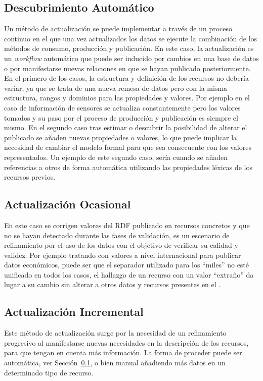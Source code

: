\subsection{Descubrimiento Automático}\label{sect:desc-auto}
Un método de actualización se puede implementar a través de un proceso 
continuo en el que una vez actualizados los datos se ejecute la combinación
de los métodos de consumo, producción y publicación. En este caso, la actualización
es un \textit{workflow} automático que puede ser inducido por cambios en una base
de datos o por manifestarse nuevas relaciones en \datasets que se hayan publicado
posteriormente. En el primero de los casos, la estructura y definición de los recursos
no debería variar, ya que se trata de una nueva remesa de datos pero con la misma estructura, 
rangos y dominios para las propiedades y valores. Por ejemplo en el caso de información
de sensores se actualiza constantemente pero los valores tomados y su paso por el proceso
de producción y publicación es siempre el mismo. En el segundo caso tras estimar o
descubrir la posibilidad de alterar el \dataset publicado se añaden nuevas propiedades
o valores, lo que puede implicar la necesidad de cambiar el modelo formal para que
sea consecuente con los valores representados. Un ejemplo de este segundo caso, sería cuando se añaden referencias a otros \datasets de forma automática utilizando
las propiedades léxicas de los recursos previos.
\subsection{Actualización Ocasional}
En este caso se corrigen valores del \dataset \gls{RDF} publicado en recursos concretos y que no 
se hayan detectado durante las fases de validación, es un escenario de refinamiento por el uso
de los datos con el objetivo de verificar su calidad y validez. Por ejemplo tratando con 
valores a nivel internacional para publicar datos económicos, puede ser que el separador
utilizado para los ``miles'' no esté unificado en todos los casos, el hallazgo de 
un recurso con un valor ``extraño'' da lugar a su cambio sin alterar a otros datos
y recursos presentes en el \dataset.
\subsection{Actualización Incremental}
Este método de actualización surge por la necesidad de un refinamiento progresivo
al manifestarse nuevas necesidades en la descripción de los recursos, para que tengan
en cuenta más información. La forma de proceder puede ser automática, ver Sección~\ref{sect:desc-auto}, o 
bien manual añadiendo más datos en un determinado tipo de recurso.
